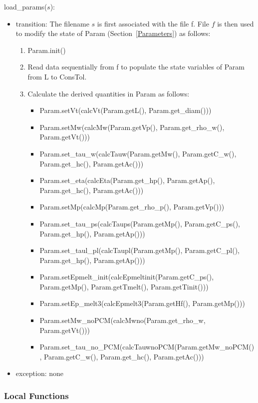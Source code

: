 \documentclass[12pt]{article}
\begin{document}
load\_params($s$):
\begin{itemize}
\item transition: The filename $s$ is first associated with the file f.
  File $f$ is then used to modify the state of Param (Section~\ref{Parameters}) as
  follows:
\begin{enumerate}
\item Param.init()
\item Read data sequentially from f to populate the state variables of
  Param from L to ConsTol.
\item Calculate the derived quantities in Param as follows:
\begin{itemize}
\item Param.setVt(calcVt(Param.getL(), Param.get\_diam()))
\item Param.setMw(calcMw(Param.getVp(), Param.get\_rho\_w(), Param.getVt()))
\item Param.set\_tau\_w(calcTauw(Param.getMw(), Param.getC\_w(), Param.get\_hc(), Param.getAc()))
\item Param.set\_eta(calcEta(Param.get\_hp(), Param.getAp(), Param.get\_hc(), Param.getAc()))
\item Param.setMp(calcMp(Param.get\_rho\_p(), Param.getVp()))
\item Param.set\_tau\_ps(calcTaups(Param.getMp(), Param.getC\_ps(),
  Param.get\_hp(), Param.getAp()))
\item Param.set\_taul\_pl(calcTaupl(Param.getMp(), Param.getC\_pl(),
  Param.get\_hp(), Param.getAp()))
\item Param.setEpmelt\_init(calcEpmeltinit(Param.getC\_ps(), Param.getMp(),
  Param.getTmelt(), Param.getTinit()))
\item Param.setEp\_melt3(calcEpmelt3(Param.getHf(), Param.getMp()))
\item Param.setMw\_noPCM(calcMwno(Param.get\_rho\_w, Param.getVt()))
\item Param.set\_tau\_no\_PCM(calcTauwnoPCM(Param.getMw\_noPCM(),
  Param.getC\_w(), Param.get\_hc(), Param.getAc()))
\end{itemize}
\end{enumerate}

\item exception: none
\end{itemize}

\subsubsection{Local Functions}
\end{document}
